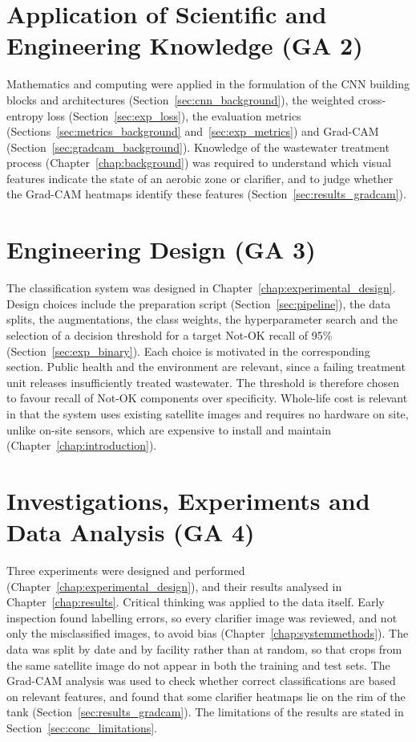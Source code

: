 \section{Application of Scientific and Engineering Knowledge (GA 2)}
Mathematics and computing were applied in the formulation of the CNN building blocks and architectures (Section~\ref{sec:cnn_background}), the weighted cross-entropy loss (Section~\ref{sec:exp_loss}), the evaluation metrics (Sections~\ref{sec:metrics_background} and~\ref{sec:exp_metrics}) and Grad-CAM (Section~\ref{sec:gradcam_background}). Knowledge of the wastewater treatment process (Chapter~\ref{chap:background}) was required to understand which visual features indicate the state of an aerobic zone or clarifier, and to judge whether the Grad-CAM heatmaps identify these features (Section~\ref{sec:results_gradcam}).

\section{Engineering Design (GA 3)}
The classification system was designed in Chapter~\ref{chap:experimental_design}. Design choices include the preparation script (Section~\ref{sec:pipeline}), the data splits, the augmentations, the class weights, the hyperparameter search and the selection of a decision threshold for a target Not-OK recall of 95\% (Section~\ref{sec:exp_binary}). Each choice is motivated in the corresponding section. Public health and the environment are relevant, since a failing treatment unit releases insufficiently treated wastewater. The threshold is therefore chosen to favour recall of Not-OK components over specificity. Whole-life cost is relevant in that the system uses existing satellite images and requires no hardware on site, unlike on-site sensors, which are expensive to install and maintain (Chapter~\ref{chap:introduction}).

\section{Investigations, Experiments and Data Analysis (GA 4)}
Three experiments were designed and performed (Chapter~\ref{chap:experimental_design}), and their results analysed in Chapter~\ref{chap:results}. Critical thinking was applied to the data itself. Early inspection found labelling errors, so every clarifier image was reviewed, and not only the misclassified images, to avoid bias (Chapter~\ref{chap:systemmethods}). The data was split by date and by facility rather than at random, so that crops from the same satellite image do not appear in both the training and test sets. The Grad-CAM analysis was used to check whether correct classifications are based on relevant features, and found that some clarifier heatmaps lie on the rim of the tank (Section~\ref{sec:results_gradcam}). The limitations of the results are stated in Section~\ref{sec:conc_limitations}.

